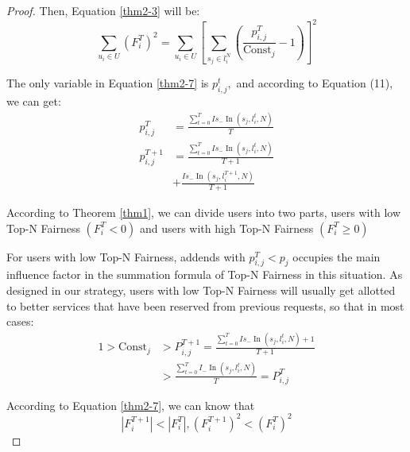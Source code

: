 \begin{proof}
Then, Equation \ref{thm2-3} will be:
\begin{equation}
\sum_{u_{i} \in U}\left(F_{i}^{T}\right)^{2}=\sum_{u_{i} \in U}\left[\sum_{s_{j} \in l_{i}^{N}}\left(\frac{p_{i, j}^{T}}{\text {Const}_{j}}-1\right)\right]^{2}
\label{thm2-7}
\end{equation}

The only variable in Equation \ref{thm2-7} is $p_{i, j}^{t},$ and according to Equation (11), we can get:
\begin{equation}
\begin{aligned}
p_{i, j}^{T} &=\frac{\sum_{t=0}^{T} I s_{-} \operatorname{In}\left(s_{j}, l_{i}^{t}, N\right)}{T} \\
p_{i, j}^{T+1} &=\frac{\sum_{t=0}^{T} I s_{-} \operatorname{In}\left(s_{j}, l_{i}^{t}, N\right)}{T+1} \\
&+\frac{I s_{-} \operatorname{In}\left(s_{j}, l_{i}^{T+1}, N\right)}{T+1}
\end{aligned}
\label{thm2-8}
\end{equation}

According to Theorem \ref{thm1}, we can divide users into two parts, users with low Top-N Fairness $\left(F_{i}^{T}<0\right)$ and users with high Top-N Fairness $\left(F_{i}^{T} \geqslant 0\right)$

For users with low Top-N Fairness, addends with $p_{i, j}^{T}<p_{j}$ occupies the main influence factor in the summation formula of Top-N Fairness in this situation. As designed in our strategy, users with low Top-N Fairness will usually get allotted to better services that have been reserved from previous requests, so that in most cases:
\begin{equation}
\begin{aligned}
1>\text {Const}_{j} &>P_{i, j}^{T+1}=\frac{\sum_{t=0}^{T} I s_{-} \operatorname{In}\left(s_{j}, l_{i}^{t}, N\right)+1}{T+1} \\
&>\frac{\sum_{t=0}^{T} I_{-} \operatorname{In}\left(s_{j}, l_{i}^{t}, N\right)}{T}=P_{i, j}^{T}
\end{aligned}
\label{thm2-9}
\end{equation}

According to Equation \ref{thm2-7}, we can know that
\begin{equation}
\left|F_{i}^{T+1}\right|<\left|F_{i}^{T}\right|,\left(F_{i}^{T+1}\right)^{2}<\left(F_{i}^{T}\right)^{2}
\label{thm2-10}
\end{equation}


\end{proof}
